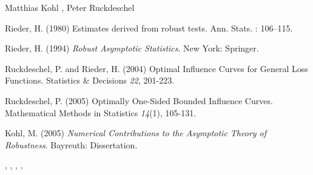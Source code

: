 \begin{Author}\relax
Matthias Kohl ,
Peter Ruckdeschel 
\end{Author}
\begin{References}\relax
Rieder, H. (1980) Estimates derived from robust tests. Ann. Stats. : 106--115.

Rieder, H. (1994) \emph{Robust Asymptotic Statistics}. New York: Springer.

Ruckdeschel, P. and Rieder, H. (2004) Optimal Influence Curves for
General Loss Functions. Statistics \& Decisions \emph{22}, 201-223.

Ruckdeschel, P. (2005) Optimally One-Sided Bounded Influence Curves.
Mathematical Methods in Statistics \emph{14}(1), 105-131.

Kohl, M. (2005) \emph{Numerical Contributions to the Asymptotic Theory of Robustness}. 
Bayreuth: Dissertation.
\end{References}
\begin{SeeAlso}\relax
{}, ,
, , 
\end{SeeAlso}

